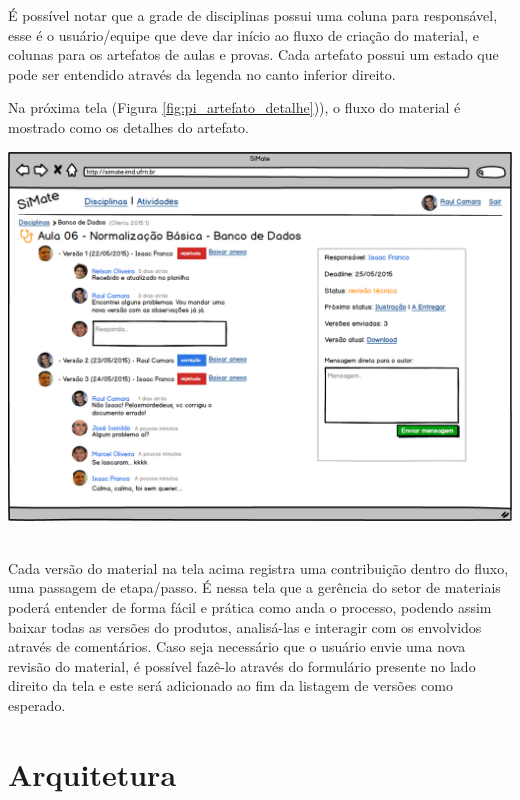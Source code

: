 É possível notar que a grade de disciplinas possui uma coluna para responsável, esse é o usuário/equipe que deve dar início ao fluxo de criação do material, e colunas para os artefatos de aulas e provas. Cada artefato possui um estado que pode ser entendido através da legenda no canto inferior direito.

Na próxima tela (Figura \hyperref[fig:pi_artefato_detalhe]{\ref{fig:pi_artefato_detalhe}})), o fluxo do material é mostrado como os detalhes do artefato. 

\vspace{5mm}
\begin{minipage}[c]{\textwidth}
    \includegraphics[width=15cm]{Imagens/SiMateTelas/ArtefatoDetalhe.png}
	\label{fig:pi_artefato_detalhe}
\end{minipage} \\

Cada versão do material na tela acima registra uma contribuição dentro do fluxo, uma passagem de etapa/passo. É nessa tela que a gerência do setor de materiais poderá entender de forma fácil e prática como anda o processo, podendo assim baixar todas as versões do produtos, analisá-las e interagir com os envolvidos através de comentários. Caso seja necessário que o usuário envie uma nova revisão do material, é possível fazê-lo através do formulário presente no lado direito da tela e este será adicionado ao fim da listagem de versões como esperado.

\section{Arquitetura}

